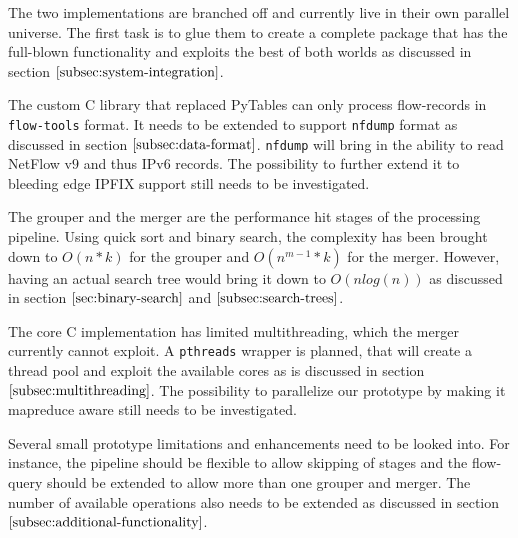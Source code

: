 The two implementations are branched off and currently live in their own parallel universe. The first task is to glue them to create a complete package that has the full-blown functionality and exploits the best of both worlds as discussed in section $\ref{subsec:system-integration}$. 

\vspace{10pt}

The custom C library that replaced PyTables can only process flow-records in \texttt{flow-tools} format. It needs to be extended to support \texttt{nfdump} format as discussed in section $\ref{subsec:data-format}$. \texttt{nfdump} will bring in the ability to read NetFlow v$9$ and thus \ac{IP}v$6$ records. The possibility to further extend it to bleeding edge \ac{IPFIX} support still needs to be investigated. 

\vspace{10pt}

The grouper and the merger are the performance hit stages of the processing pipeline. Using quick sort and binary search, the complexity has been brought down to $O(n*k)$ for the grouper and $O(n^{m-1}*k)$ for the merger. However, having an actual search tree would bring it down to $O(nlog(n))$ as discussed in section $\ref{sec:binary-search}$ and $\ref{subsec:search-trees}$. 

\vspace{10pt}

The core C implementation has limited multithreading, which the merger currently cannot exploit. A \texttt{pthreads} wrapper is planned, that will create a thread pool and exploit the available cores as is discussed in section $\ref{subsec:multithreading}$. The possibility to parallelize our prototype by making it mapreduce aware still needs to be investigated. 

\vspace{10pt}

Several small prototype limitations and enhancements need to be looked into. For instance, the pipeline should be flexible to allow skipping of stages and the flow-query should be extended to allow more than one grouper and merger. The number of available operations also needs to be extended as discussed in section $\ref{subsec:additional-functionality}$. 